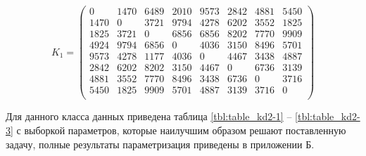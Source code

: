 \begin{equation}
	\label{eq:kd2}
	K_{1} = \begin{pmatrix}
		0 & 1470 & 6489 & 2010 & 9573 & 2842 & 4881 & 5450 \\
		1470 & 0 & 3721 & 9794 & 4278 & 6202 & 3552 & 1825 \\
		1825 & 3721 & 0 & 6856 & 6856 & 8202 & 7770 & 9909 \\
		4924 & 9794 & 6856 & 0 & 4036 & 3150 & 8496 & 5701 \\
		9573 & 4278 & 1177 & 4036 & 0 & 4467 & 3438 & 4887 \\
		2842 & 6202 & 8202 & 3150 & 4467 & 0 & 6736 & 3139 \\
		4881 & 3552 & 7770 & 8496 & 3438 & 6736 & 0 & 3716 \\
		5450 & 1825 & 9909 & 5701 & 4887 & 3139 & 3716 & 0 \\
	\end{pmatrix}
\end{equation}

Для данного класса данных приведена таблица \ref{tbl:table_kd2-1} -- \ref{tbl:table_kd2-3}	с выборкой параметров, которые наилучшим образом решают поставленную задачу, полные результаты параметризация приведены в приложении Б. 

\clearpage

